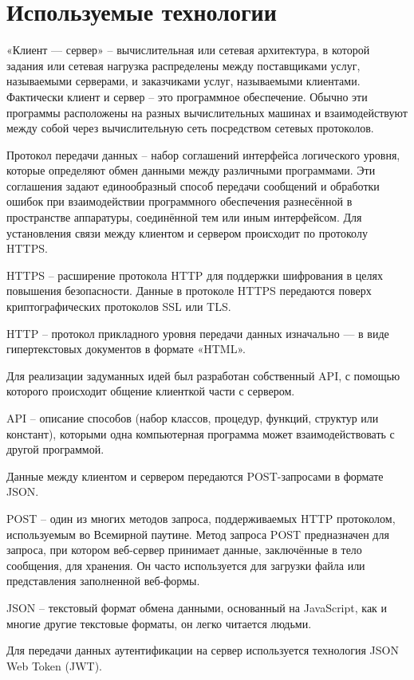 \documentclass[14pt, a4paper]{extarticle}
\begin{document}
    \clearpage
    \section{Используемые технологии}
    «Клиент — сервер» – вычислительная или сетевая архитектура, в которой задания или сетевая нагрузка распределены между поставщиками услуг, называемыми серверами, и заказчиками услуг, называемыми клиентами. Фактически клиент и сервер – это программное обеспечение. Обычно эти программы расположены на разных вычислительных машинах и взаимодействуют между собой через вычислительную сеть посредством сетевых протоколов.

    Протокол передачи данных – набор соглашений интерфейса логического уровня, которые определяют обмен данными между различными программами. Эти соглашения задают единообразный способ передачи сообщений и обработки ошибок при взаимодействии программного обеспечения разнесённой в пространстве аппаратуры, соединённой тем или иным интерфейсом. Для установления связи между клиентом и сервером происходит по протоколу HTTPS.

    HTTPS – расширение протокола HTTP для поддержки шифрования в целях повышения безопасности. Данные в протоколе HTTPS передаются поверх криптографических протоколов SSL или TLS.

    HTTP – протокол прикладного уровня передачи данных изначально — в виде гипертекстовых документов в формате «HTML».

    Для реализации задуманных идей был разработан собственный API, с помощью которого происходит общение клиенткой части с сервером.

    API – описание способов (набор классов, процедур, функций, структур или констант), которыми одна компьютерная программа может взаимодействовать с другой программой.

    Данные между клиентом и сервером передаются POST-запросами в формате JSON.

    POST – один из многих методов запроса, поддерживаемых HTTP протоколом, используемым во Всемирной паутине. Метод запроса POST предназначен для запроса, при котором веб-сервер принимает данные, заключённые в тело сообщения, для хранения. Он часто используется для загрузки файла или представления заполненной веб-формы.

    JSON – текстовый формат обмена данными, основанный на JavaScript, как и многие другие текстовые форматы, он легко читается людьми.

    Для передачи данных аутентификации на сервер используется технология JSON Web Token (JWT).
\end{document}
